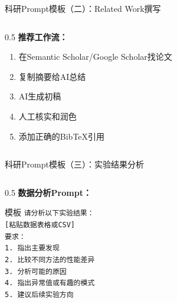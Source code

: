 \documentclass[aspectratio=169,11pt]{beamer}
\begin{document}
\begin{frame}[fragile]{科研Prompt模板（二）：Related Work撰写}
\begin{columns}
\begin{column}{0.5\textwidth}
            \vspace{0.2cm}
            \textbf{推荐工作流：}
            \begin{enumerate}
                \item 在Semantic Scholar/Google Scholar找论文
                \item 复制摘要给AI总结
                \item AI生成初稿
                \item 人工核实和润色
                \item 添加正确的BibTeX引用
            \end{enumerate}
        \end{column}
    \end{columns}
\end{frame}

\begin{frame}[fragile]{科研Prompt模板（三）：实验结果分析}
    \begin{columns}
        \begin{column}{0.5\textwidth}
            \textbf{数据分析Prompt：}
            \begin{exampleblock}{模板}
                \scriptsize
                \texttt{请分析以下实验结果：}\\
                \texttt{[粘贴数据表格或CSV]}\\
                \texttt{要求：}\\
                \texttt{1. 指出主要发现}\\
                \texttt{2. 比较不同方法的性能差异}\\
                \texttt{3. 分析可能的原因}\\
                \texttt{4. 指出异常值或有趣的模式}\\
                \texttt{5. 建议后续实验方向}
            \end{exampleblock}
            

\end{column}
\end{columns}
\end{frame}
\end{document}
